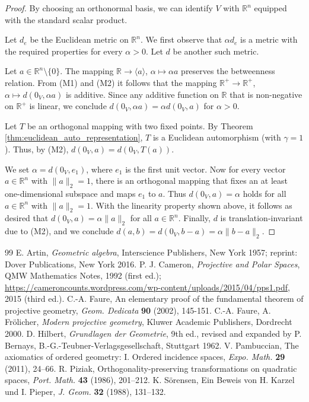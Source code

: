 \documentclass[11pt,a4paper]{article}
\begin{document}
\begin{proof}
By choosing an orthonormal basis, we can identify $V$ with $\mathbb{R}^n$ equipped with the standard scalar product.

Let $d_e$ be the Euclidean metric on $\mathbb{R}^n$. We first observe that $\alpha d_e$ is a metric with the required properties for every $\alpha > 0$. Let $d$ be another such metric.

Let $a \in \mathbb{R}^n \setminus \{0\}$. The mapping $\mathbb{R} \to \langle a \rangle$, $\alpha \mapsto \alpha a$ preserves the betweenness relation. From (M1) and (M2) it follows that the mapping $\mathbb{R}^+ \to \mathbb{R}^+$, $\alpha \mapsto d(0_V, \alpha a)$ is additive. Since any additive function on $\mathbb{R}$ that is non-negative on $\mathbb{R}^+$ is linear, we conclude $d(0_V, \alpha a) = \alpha d(0_V, a)$ for $\alpha > 0$.

Let $T$ be an orthogonal mapping with two fixed points. By Theorem \ref{thm:euclidean_auto_representation}, $T$ is a Euclidean automorphism (with $\gamma=1$). Thus, by (M2), $d(0_V, a) = d(0_V, T(a))$.

We set $\alpha = d(0_V, e_1)$, where $e_1$ is the first unit vector. Now for every vector $a \in \mathbb{R}^n$ with $\|a\|_2 = 1$, there is an orthogonal mapping that fixes an at least one-dimensional subspace and maps $e_1$ to $a$. Thus $d(0_V, a) = \alpha$ holds for all $a \in \mathbb{R}^n$ with $\|a\|_2 = 1$. With the linearity property shown above, it follows as desired that $d(0_V, a) = \alpha\|a\|_2$ for all $a \in \mathbb{R}^n$. Finally, $d$ is translation-invariant due to (M2), and we conclude $d(a, b) = d(0_V, b - a) = \alpha\|b - a\|_2$.
\end{proof}

\begin{thebibliography}{99}
 E. Artin, \textit{Geometric algebra}, Interscience Publishers, New York 1957; reprint: Dover Publications, New York 2016.
 P. J. Cameron, \textit{Projective and Polar Spaces}, QMW Mathematics Notes, 1992 (first ed.); \url{https://cameroncounts.wordpress.com/wp-content/uploads/2015/04/pps1.pdf}, 2015 (third ed.).
 C.-A. Faure, An elementary proof of the fundamental theorem of projective geometry, \textit{Geom. Dedicata} \textbf{90} (2002), 145-151.
 C.-A. Faure, A. Fr\"olicher, \textit{Modern projective geometry}, Kluwer Academic Publishers, Dordrecht 2000.
 D. Hilbert, \textit{Grundlagen der Geometrie}, 9th ed., revised and expanded by P. Bernays, B.-G.-Teubner-Verlagsgesellschaft, Stuttgart 1962.
 V. Pambuccian, The axiomatics of ordered geometry: I. Ordered incidence spaces, \textit{Expo. Math.} \textbf{29} (2011), 24--66.
 R. Piziak, Orthogonality-preserving transformations on quadratic spaces, \textit{Port. Math.} \textbf{43} (1986), 201--212.
 K. S\"orensen, Ein Beweis von H. Karzel und I. Pieper, \textit{J. Geom.} \textbf{32} (1988), 131--132.
\end{thebibliography}
\end{document}
